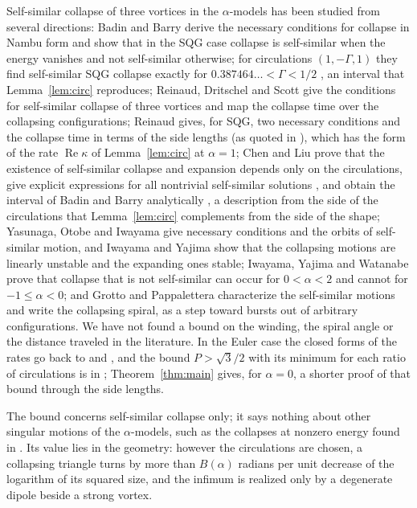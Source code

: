 \documentclass[11pt]{article}
\theoremstyle{definition}
\newcommand{\re}{\operatorname{Re}}
\begin{document}
Self-similar collapse of three vortices in the $\alpha$-models has been studied from several directions: Badin and Barry \cite{bb2018} derive the necessary conditions for collapse in Nambu form and show that in the SQG case collapse is self-similar when the energy vanishes and not self-similar otherwise; for circulations $(1, -\Gamma, 1)$ they find self-similar SQG collapse exactly for $0.387464\ldots < \Gamma < 1/2$ \cite[Lemma~1]{bb2018}, an interval that Lemma~\ref{lem:circ} reproduces; Reinaud, Dritschel and Scott \cite{rds2022} give the conditions for self-similar collapse of three vortices and map the collapse time over the collapsing configurations; Reinaud \cite{reinaud2021} gives, for SQG, two necessary conditions and the collapse time in terms of the side lengths (as quoted in \cite{cl2024}), which has the form of the rate $\re\kappa$ of Lemma~\ref{lem:circ} at $\alpha = 1$; Chen and Liu \cite{cl2024} prove that the existence of self-similar collapse and expansion depends only on the circulations, give explicit expressions for all nontrivial self-similar solutions \cite[Theorems~2.1, 2.2]{cl2024}, and obtain the interval of Badin and Barry analytically \cite[Theorem~4.1]{cl2024}, a description from the side of the circulations that Lemma~\ref{lem:circ} complements from the side of the shape; Yasunaga, Otobe and Iwayama \cite{yoi2021} give necessary conditions and the orbits of self-similar motion, and Iwayama and Yajima \cite{iy2023} show that the collapsing motions are linearly unstable and the expanding ones stable; Iwayama, Yajima and Watanabe \cite{iyw2025} prove that collapse that is not self-similar can occur for $0 < \alpha < 2$ and cannot for $-1 \le \alpha < 0$; and Grotto and Pappalettera \cite[Prop.~2.1]{gp2025} characterize the self-similar motions and write the collapsing spiral, as a step toward bursts out of arbitrary configurations. We have not found a bound on the winding, the spiral angle or the distance traveled in the literature. In the Euler case the closed forms of the rates go back to \cite{cds1980} and \cite{kimura1987}, and the bound $P > \sqrt3/2$ with its minimum for each ratio of circulations is in \cite{hendrick2026}; Theorem~\ref{thm:main} gives, for $\alpha = 0$, a shorter proof of that bound through the side lengths.

The bound concerns self-similar collapse only; it says nothing about other singular motions of the $\alpha$-models, such as the collapses at nonzero energy found in \cite{bb2018,iyw2025}. Its value lies in the geometry: however the circulations are chosen, a collapsing triangle turns by more than $B(\alpha)$ radians per unit decrease of the logarithm of its squared size, and the infimum is realized only by a degenerate dipole beside a strong vortex.
\end{document}
